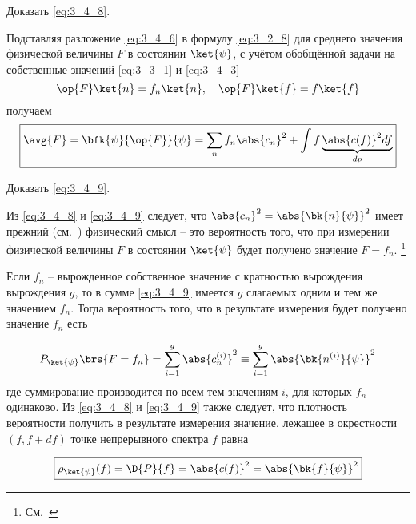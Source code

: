 \begin{excr}
Доказать \eqref{eq:3_4_8}.
\end{excr}


Подставляя разложение \eqref{eq:3_4_6} в формулу \eqref{eq:3_2_8} для среднего значения физической величины $F$ в состоянии $\ket{\psi}$, с учётом обобщённой задачи на собственные значений \eqref{eq:3_3_1} и \eqref{eq:3_4_3}
$$
\op{F} \ket{n} = f_n \ket{n}, ~~~ \op{F} \ket{f} = f \ket{f}
$$%
получаем
\begin{equation}
\label{eq:3_4_9}
\boxed {
	\avg{F} = \bfk{\psi}{\op{F}}{\psi} = \sum_n f_n \abs{c_n}^2 + \int f \underbrace{\abs{c(f)}^2 df}_{dp}
}
\end{equation}

\begin{excr}
Доказать \eqref{eq:3_4_9}.
\end{excr}

Из \eqref{eq:3_4_8} и \eqref{eq:3_4_9} следует, что $\abs{c_n}^2 = \abs{\bk{n}{\psi}}^2$ имеет прежний (см.~) физический смысл -- это вероятность того, что при измерении физической величины $F$ в состоянии $\ket{\psi}$ будет получено значение $F = f_n$. \footnote{См.~}

Если $f_n$ -- вырожденное собственное значение с кратностью вырождения вырождения $g$, то в сумме \eqref{eq:3_4_9} имеется $g$ слагаемых одним и тем же значением $f_n$. Тогда вероятность того, что в результате измерения будет получено значение $f_n$ есть

\begin{equation}
\label{eq:3_4_10}
P_{\ket{\psi}} \brs{F = f_n} =
  \sum_{i=1}^{g} \abs{c_n^{(i)}}^2 \equiv
  \sum_{i=1}^{g} \abs{ \bk{n^{(i)}}{\psi} }^2
\end{equation}%
%
где суммирование производится по всем тем значениям $i$, для которых $f_n$ одинаково. Из \eqref{eq:3_4_8} и \eqref{eq:3_4_9} также следует, что плотность вероятности получить в результате измерения значение, лежащее в окрестности $(f, f + df)$ точке непрерывного спектра $f$ равна

\begin{equation}
\label{eq:3_4_11}
\boxed {
	\rho_{\ket{\psi}}(f) = \D{P}{f} = \abs{c(f)}^2 = \abs{\bk{f}{\psi}}^2
}
\end{equation}

